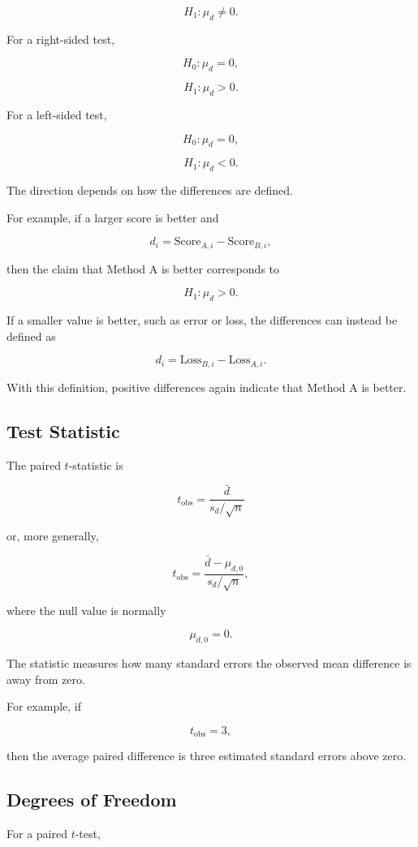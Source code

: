 \documentclass[11pt]{article}
\begin{document}
\[
H_1:\mu_d\neq 0.
\]

For a right-sided test,

\[
H_0:\mu_d=0,
\]

\[
H_1:\mu_d>0.
\]

For a left-sided test,

\[
H_0:\mu_d=0,
\]

\[
H_1:\mu_d<0.
\]

The direction depends on how the differences are defined.

For example, if a larger score is better and

\[
d_i=\text{Score}_{A,i}-\text{Score}_{B,i},
\]

then the claim that Method A is better corresponds to

\[
H_1:\mu_d>0.
\]

If a smaller value is better, such as error or loss, the differences can
instead be defined as

\[
d_i=\text{Loss}_{B,i}-\text{Loss}_{A,i}.
\]

With this definition, positive differences again indicate that Method A
is better.

\subsection{Test Statistic}

The paired \(t\)-statistic is

\[
\boxed{
t_{\mathrm{obs}}
=
\frac{\bar{d}}{s_d/\sqrt{n}}
}
\]

or, more generally,

\[
t_{\mathrm{obs}}
=
\frac{\bar{d}-\mu_{d,0}}{s_d/\sqrt{n}},
\]

where the null value is normally

\[
\mu_{d,0}=0.
\]

The statistic measures how many standard errors the observed mean
difference is away from zero.

For example, if

\[
t_{\mathrm{obs}}=3,
\]

then the average paired difference is three estimated standard errors
above zero.

\subsection{Degrees of Freedom}

For a paired \(t\)-test,
\end{document}
